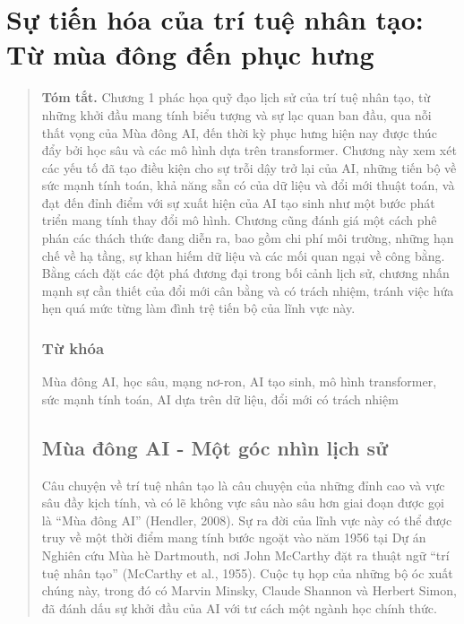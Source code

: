 \chapter{Sự tiến hóa của trí tuệ nhân tạo: Từ mùa đông đến phục hưng}

\begin{quote}\small

\textbf{Tóm tắt.} Chương 1 phác họa quỹ đạo lịch sử của trí tuệ nhân tạo, từ những khởi đầu mang tính biểu tượng và sự lạc quan ban đầu, qua nỗi thất vọng của Mùa đông AI, đến thời kỳ phục hưng hiện nay được thúc đẩy bởi học sâu và các mô hình dựa trên transformer. Chương này xem xét các yếu tố đã tạo điều kiện cho sự trỗi dậy trở lại của AI, những tiến bộ về sức mạnh tính toán, khả năng sẵn có của dữ liệu và đổi mới thuật toán, và đạt đến đỉnh điểm với sự xuất hiện của AI tạo sinh như một bước phát triển mang tính thay đổi mô hình. Chương cũng đánh giá một cách phê phán các thách thức đang diễn ra, bao gồm chi phí môi trường, những hạn chế về hạ tầng, sự khan hiếm dữ liệu và các mối quan ngại về công bằng. Bằng cách đặt các đột phá đương đại trong bối cảnh lịch sử, chương nhấn mạnh sự cần thiết của đổi mới cân bằng và có trách nhiệm, tránh việc hứa hẹn quá mức từng làm đình trệ tiến bộ của lĩnh vực này.

\subsection{Từ khóa}

Mùa đông AI, học sâu, mạng nơ-ron, AI tạo sinh, mô hình transformer, sức mạnh tính toán, AI dựa trên dữ liệu, đổi mới có trách nhiệm

\section{}

\section{\texorpdfstring{\textbf{Mùa đông AI} \textbf{- Một góc nhìn lịch sử}}{Mùa đông AI - Một góc nhìn lịch sử}}

Câu chuyện về trí tuệ nhân tạo là câu chuyện của những đỉnh cao và vực sâu đầy kịch tính, và có lẽ không vực sâu nào sâu hơn giai đoạn được gọi là ``Mùa đông AI'' (Hendler, 2008). Sự ra đời của lĩnh vực này có thể được truy về một thời điểm mang tính bước ngoặt vào năm 1956 tại Dự án Nghiên cứu Mùa hè Dartmouth, nơi John McCarthy đặt ra thuật ngữ ``trí tuệ nhân tạo'' (McCarthy et al., 1955). Cuộc tụ họp của những bộ óc xuất chúng này, trong đó có Marvin Minsky, Claude Shannon và Herbert Simon, đã đánh dấu sự khởi đầu của AI với tư cách một ngành học chính thức.


\end{quote}
